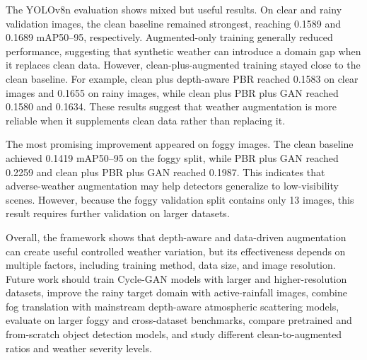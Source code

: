\documentclass[10pt,letterpaper]{article}
\begin{document}
The YOLOv8n evaluation shows mixed but useful results. On clear and rainy validation images, the clean baseline remained strongest, reaching 0.1589 
and 0.1689 mAP50--95, respectively. Augmented-only training generally reduced performance, suggesting that synthetic weather can introduce a domain gap 
when it replaces clean data. However, clean-plus-augmented training stayed close to the clean baseline. For example, clean plus depth-aware PBR reached 
0.1583 on clear images and 0.1655 on rainy images, while clean plus PBR plus GAN reached 0.1580 and 0.1634. These results suggest that weather augmentation 
is more reliable when it supplements clean data rather than replacing it.

The most promising improvement appeared on foggy images. The clean baseline achieved 0.1419 mAP50--95 on the foggy split, while PBR plus GAN reached 
0.2259 and clean plus PBR plus GAN reached 0.1987. This indicates that adverse-weather augmentation may help detectors generalize to low-visibility scenes. 
However, because the foggy validation split contains only 13 images, this result requires further validation on larger datasets.

Overall, the framework shows that depth-aware and data-driven augmentation can create useful controlled weather variation, but its effectiveness depends 
on multiple factors, including training method, data size, and image resolution. Future work should train Cycle-GAN models with larger and higher-resolution datasets, 
improve the rainy target domain with active-rainfall images, combine fog translation with mainstream depth-aware atmospheric scattering models, evaluate on larger foggy and 
cross-dataset benchmarks, compare pretrained and from-scratch object detection models, and study different clean-to-augmented ratios and weather severity levels.

\clearpage
{\doublespacing
\printbibliography[heading=bibliography,title={References}]
}
\end{document}
